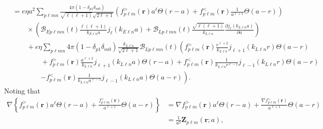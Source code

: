 \documentclass{article}
\begin{document}
\begin{equation}
\begin{split}
&= e\eta a^2\sum_{p\ell mn}\frac{4\pi(1 - \delta_{p1}\delta_{m0})}{\sqrt{\ell(\ell + 1)}\sqrt{2\ell + 1}}\left(f_{p\ell m}^>(\mathbf{r})a^\ell\Theta(r - a) + f_{p\ell m}^<(\mathbf{r})\frac{1}{a^{\ell + 1}}\Theta(a - r)\right)\\
&\qquad\times\left(\mathcal{B}_{Ep\ell mn}(t)\frac{\ell(\ell + 1)}{k_{E\ell n}a}j_\ell(k_{E\ell n}a) + \mathcal{B}_{Lp\ell mn}(t)\frac{\sqrt{\ell(\ell + 1)}}{k_{L\ell n}}\frac{\partial j_{\ell}(k_{L\ell n}a)}{\partial a}\right)\\
&\qquad + e\eta\sum_{p\ell mn}4\pi(1 - \delta_{p1}\delta_{m0})\frac{k_{L\ell n}}{\sqrt{2\ell + 1}}\mathcal{B}_{Lp\ell mn}(t)\left(f_{p\ell m}^>(\mathbf{r})\frac{r^{\ell + 2}}{k_{L\ell n}}j_{\ell + 1}(k_{L\ell n}r)\Theta(a - r)\right.\\
&\qquad\qquad + f_{p\ell m}^>(\mathbf{r})\frac{a^{\ell + 2}}{k_{L\ell n}}j_{\ell + 1}(k_{L\ell n}a)\Theta(r - a) + f_{p\ell m}^<(\mathbf{r})\frac{1}{k_{L\ell n}r^{\ell - 1}}j_{\ell - 1}(k_{L\ell n}r)\Theta(a - r)\\
&\qquad\qquad\left. - f_{p\ell m}^<(\mathbf{r})\frac{1}{k_{L\ell n}a^{\ell - 1}}j_{\ell - 1}(k_{L\ell n}a)\Theta(a - r)\right).
\end{split}
\end{equation}
Noting that
\begin{equation}
\begin{split}
\nabla\left\{f_{p\ell m}^>(\mathbf{r})a^\ell\Theta(r - a) + \frac{f_{p\ell m}^<(\mathbf{r})}{a^{\ell + 1}}\Theta(a - r)\right\} &= \nabla f_{p\ell m}^>(\mathbf{r})a^\ell\Theta(r - a) + \frac{\nabla f_{p\ell m}^<(\mathbf{r})}{a^{\ell + 1}}\Theta(a - r)\\
&= \frac{1}{a^2}\mathbf{Z}_{p\ell m}(\mathbf{r};a),
\end{split}
\end{equation}
\end{document}

